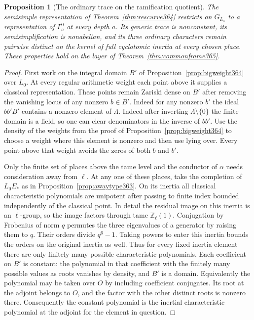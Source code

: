 \documentclass[a4paper,11pt]{article}
\newtheorem{proposition}{Proposition}[section]
\theoremstyle{definition}
\theoremstyle{remark}
\newcommand{\ZZ}{\mathbb Z}\newcommand{\ord}{\operatorname{ord}}
\numberwithin{equation}{section}
\begin{document}
\begin{proposition}[The ordinary trace on the ramification quotient]
\label{prop:tamecurve365}
The semisimple representation of
Theorem~\ref{thm:rescurve364} restricts on \(G_{L_a}\) to a
representation of \(\Gamma_a^0\) at every depth \(a\). Its
generic trace is nonconstant, its semisimplification is
nonabelian, and its three ordinary characters remain pairwise
distinct on the kernel of full cyclotomic inertia at every
chosen place. These properties hold on the layer of
Theorem~\ref{thm:commonframe365}.
\end{proposition}
\begin{proof}
First work on the integral domain \(B'\) of
Proposition~\ref{prop:bigweight364} over \(L_0\). At every
regular arithmetic weight each point above it supplies a
classical representation. These points remain Zariski dense
on \(B'\) after removing the vanishing locus of any nonzero
\(b\in B'\). Indeed for any nonzero \(b'\) the ideal
\(bb'B'\) contains a nonzero element of \(\Lambda\).
Indeed after inverting \(\Lambda\setminus\{0\}\) the finite domain
is a field, so one can clear denominators in the inverse
of \(bb'\). Use the density of the weights from the proof of
Proposition~\ref{prop:bigweight364} to choose a weight where
this element is nonzero and then use lying over. Every
point above that weight avoids the zeros of both \(b\) and \(b'\).

Only the finite set of places above the tame level and the
conductor of \(\alpha\) needs consideration away from \(\ell\).
At any one of these places, take the completion of \(L_0E_*\)
as in Proposition~\ref{prop:awaytype363}. On its inertia
all classical characteristic polynomials are unipotent after
passing to finite index bounded independently of the classical
point. In detail the residual image on this inertia is an
\(\ell\)-group, so the image factors through tame
\(\ZZ_\ell(1)\). Conjugation by Frobenius of norm \(q\)
permutes the three eigenvalues of a generator by raising them
to \(q\). Their orders divide \(q^6-1\). Taking powers to
enter this inertia bounds the orders on the original inertia
as well. Thus for every fixed inertia element there are only
finitely many possible characteristic polynomials. Each
coefficient on \(B'\) is constant: the polynomial in that
coefficient with the finitely many possible values as roots
vanishes by density, and \(B'\) is a domain. Equivalently the
polynomial may be taken over \(O\) by including coefficient
conjugates. Its root at the adjoint belongs to \(O\), and the
factor with the other distinct roots is nonzero there.
Consequently the constant polynomial is the inertial
characteristic polynomial at the adjoint for the element in
question.


\end{proof}
\end{document}
